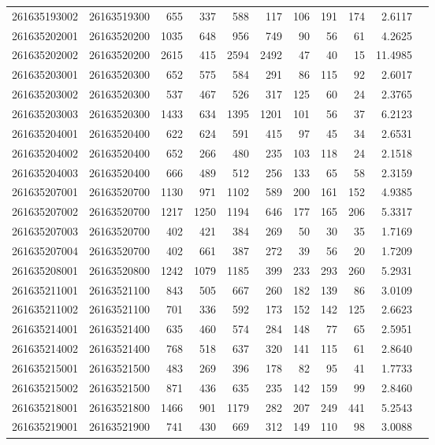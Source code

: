 \documentclass[11pt,landscape]{article}
\begin{document}
{\begin{longtable}[]{@{}lrrrrrrrrrr@{}}
261635193002 & 26163519300 & 655 & 337 & 588 & 117 & 106 & 191 & 174 & 2.6117 \\
261635202001 & 26163520200 & 1035 & 648 & 956 & 749 & 90 & 56 & 61 & 4.2625 \\
261635202002 & 26163520200 & 2615 & 415 & 2594 & 2492 & 47 & 40 & 15 & 11.4985 \\
261635203001 & 26163520300 & 652 & 575 & 584 & 291 & 86 & 115 & 92 & 2.6017 \\
261635203002 & 26163520300 & 537 & 467 & 526 & 317 & 125 & 60 & 24 & 2.3765 \\
261635203003 & 26163520300 & 1433 & 634 & 1395 & 1201 & 101 & 56 & 37 & 6.2123 \\
261635204001 & 26163520400 & 622 & 624 & 591 & 415 & 97 & 45 & 34 & 2.6531 \\
261635204002 & 26163520400 & 652 & 266 & 480 & 235 & 103 & 118 & 24 & 2.1518 \\
261635204003 & 26163520400 & 666 & 489 & 512 & 256 & 133 & 65 & 58 & 2.3159 \\
261635207001 & 26163520700 & 1130 & 971 & 1102 & 589 & 200 & 161 & 152 & 4.9385 \\
261635207002 & 26163520700 & 1217 & 1250 & 1194 & 646 & 177 & 165 & 206 & 5.3317 \\
261635207003 & 26163520700 & 402 & 421 & 384 & 269 & 50 & 30 & 35 & 1.7169 \\
261635207004 & 26163520700 & 402 & 661 & 387 & 272 & 39 & 56 & 20 & 1.7209 \\
261635208001 & 26163520800 & 1242 & 1079 & 1185 & 399 & 233 & 293 & 260 & 5.2931 \\
261635211001 & 26163521100 & 843 & 505 & 667 & 260 & 182 & 139 & 86 & 3.0109 \\
261635211002 & 26163521100 & 701 & 336 & 592 & 173 & 152 & 142 & 125 & 2.6623 \\
261635214001 & 26163521400 & 635 & 460 & 574 & 284 & 148 & 77 & 65 & 2.5951 \\
261635214002 & 26163521400 & 768 & 518 & 637 & 320 & 141 & 115 & 61 & 2.8640 \\
261635215001 & 26163521500 & 483 & 269 & 396 & 178 & 82 & 95 & 41 & 1.7733 \\
261635215002 & 26163521500 & 871 & 436 & 635 & 235 & 142 & 159 & 99 & 2.8460 \\
261635218001 & 26163521800 & 1466 & 901 & 1179 & 282 & 207 & 249 & 441 & 5.2543 \\
261635219001 & 26163521900 & 741 & 430 & 669 & 312 & 149 & 110 & 98 & 3.0088 \\

\end{longtable}}
\end{document}
